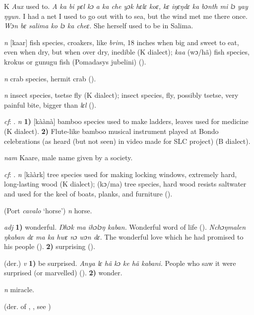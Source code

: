 \begin{letter}{K}
 \textit{Aux} used to. \textit{A ka bi pɛl kɔ a ka che yɔk hɛlɛ koɛ, kɛ iŋɛŋdɛ ka bɔnth mi lɔ yay ŋyun.} I had a net I used to go out with to sea, but the wind met me there once. \textit{Wɔn bɛ salima ko lɔ ka cheɛ.} She herself used to be in Salima.

 \textit{n} [kaar] fish species, croakers, like \textit{brim}, 18 inches when big and sweet to eat, even when dry, but when over dry, inedible (K dialect); \textit{kaa} (wɔ/hã) fish species, krokus or gunugu fish (Pomadasys jubelini) (\citealt{Pichl1967}). 

 \textit{n} crab species, hermit crab (\citealt{Pichl1967}). 

 \textit{n} insect species, tsetse fly (K dialect); insect species, fly, possibly tsetse, very painful bite, bigger than \textit{lɛl} (\citealt{Pichl1967}). 

 \textit{cf}: . \textit{n} \textbf{1)} [kàànà] bamboo species used to make ladders, leaves used for medicine (K dialect). \textbf{2)} Flute-like bamboo musical instrument played at Bondo celebrations (as heard (but not seen) in video made for SLC project) (B dialect).

 \textit{nam} Kaare, male name given by a society. 

 \textit{cf}: . \textit{n} [kààrk] tree species used for making locking windows, extremely hard, long-lasting wood (K dialect); (kɔ/ma) tree species, hard wood resists saltwater and used for the keel of boats, planks, and furniture (\citealt{Pichl1967}). 

 (Port \textit{cavalo} ‘horse') \textit{n} horse.

 \textit{adj} \textbf{1)} wonderful. \textit{ Ŋhɔk ma ihɔlɔŋ kaban.} Wonderful word of life (\citealt{Pichl1967}). \textit{Nchɔŋmalen ŋkaban dɛ ma ka hwɛ nɔ wɔn dɛ.} The wonderful love which he had promised to his people (\citealt{Pichl1967}). \textbf{2)} surprising (\citealt{Pichl1967}). 

 (der.) \textit{v} \textbf{1)} be surprised. \textit{Anya lɛ hã kɔ ke hã kabani.} People who saw it were surprised (or marvelled) (\citealt{Pichl1967}). \textbf{2)} wonder.

 \textit{n} miracle.

 (der. of , , see ) 


\end{letter}
